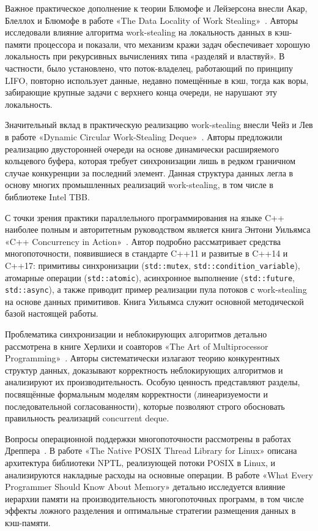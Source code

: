 Важное практическое дополнение к теории Блюмофе и Лейзерсона
внесли Акар, Блеллох и Блюмофе в работе «The Data Locality of Work
Stealing»~\cite{Acar2000}. Авторы исследовали влияние алгоритма
work-stealing на локальность данных в кэш-памяти процессора и
показали, что механизм кражи задач обеспечивает хорошую локальность
при рекурсивных вычислениях типа «разделяй и властвуй». В частности,
было установлено, что поток-владелец, работающий по принципу LIFO,
повторно использует данные, недавно помещённые в кэш, тогда как
воры, забирающие крупные задачи с верхнего конца очереди, не нарушают
эту локальность.

Значительный вклад в практическую реализацию work-stealing внесли
Чейз и Лев в работе «Dynamic Circular Work-Stealing Deque»~\cite{Chase2005}.
Авторы предложили реализацию двусторонней очереди на основе
динамически расширяемого кольцевого буфера, которая требует
синхронизации лишь в редком граничном случае конкуренции за
последний элемент. Данная структура данных легла в основу многих
промышленных реализаций work-stealing, в том числе в библиотеке
Intel TBB.

С точки зрения практики параллельного программирования на языке C++
наиболее полным и авторитетным руководством является книга Энтони
Уильямса «C++ Concurrency in Action»~\cite{Williams2019}. Автор
подробно рассматривает средства многопоточности, появившиеся
в стандарте C++11 и развитые в C++14 и C++17: примитивы
синхронизации (\texttt{std::mutex}, \texttt{std::condition\_variable}),
атомарные операции (\texttt{std::atomic}), асинхронное выполнение
(\texttt{std::future}, \texttt{std::async}), а также приводит
пример реализации пула потоков с work-stealing на основе данных
примитивов. Книга Уильямса служит основной методической базой
настоящей работы.

Проблематика синхронизации и неблокирующих алгоритмов детально
рассмотрена в книге Херлихи и соавторов «The Art of Multiprocessor
Programming»~\cite{Herlihy2020}. Авторы систематически излагают
теорию конкурентных структур данных, доказывают корректность
неблокирующих алгоритмов и анализируют их производительность.
Особую ценность представляют разделы, посвящённые формальным
моделям корректности (линеаризуемости и последовательной
согласованности), которые позволяют строго обосновать правильность
реализаций concurrent deque.

Вопросы операционной поддержки многопоточности рассмотрены
в работах Дреппера~\cite{Drepper2003, Drepper2007}. В работе
«The Native POSIX Thread Library for Linux» описана архитектура
библиотеки NPTL, реализующей потоки POSIX в Linux, и анализируются
накладные расходы на основные операции. В работе «What Every
Programmer Should Know About Memory» детально исследуется влияние
иерархии памяти на производительность многопоточных программ,
в том числе эффекты ложного разделения и оптимальные стратегии
размещения данных в кэш-памяти.

